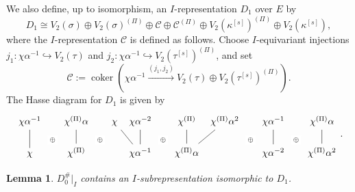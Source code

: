 \documentclass[a4paper,10pt,twoside]{amsart}
\newtheorem{lemma}[theorem]{Lemma}
\theoremstyle{definition}
\numberwithin{equation}{section}
\begin{document}
We also define, up to isomorphism, an \(I\)-representation
\(D_1\) over \(E\) by
\begin{equation*}
D_1\cong V_2(\sigma)\oplus V_2(\sigma)^{(\Pi)}
\oplus\mathcal C\oplus \mathcal C^{(\Pi)} \oplus V_2(\kappa^{[s]})^{(\Pi)}
\oplus V_2(\kappa^{[s]}),
\end{equation*}
where the \(I\)-representation \(\mathcal C\) is defined as follows.
Choose \(I\)-equivariant injections $j_1:\chi\alpha^{-1}\hookrightarrow V_2(\tau)$ and $j_2:\chi\alpha^{-1}\hookrightarrow V_2(\tau^{[s]})^{(\Pi)}$, and set
\[
\mathcal C:=
\operatorname{coker}\!\left(
\chi\alpha^{-1}
\xrightarrow{(j_1,j_2)}
V_2(\tau)\oplus V_2(\tau^{[s]})^{(\Pi)}
\right).
\]
The Hasse diagram for $D_1$ is given by \[
\begin{tikzcd}[column sep=0.35em, row sep=1.5em]
{\chi \alpha^{-1}} \arrow[d, no head] & \arrow[d, "\oplus" description, draw=none] & {\chi^{(\Pi)}\alpha} \arrow[d, no head] & \arrow[d, "\oplus" description, draw=none] & \chi \arrow[dr, no head] & {\chi\alpha^{-2}} \arrow[d, no head] & \arrow[d, "\oplus" description, draw=none] & {\chi^{(\Pi)}} \arrow[d, no head] & {\chi^{(\Pi)}\alpha^2} \arrow[dl, no head] & \arrow[d, "\oplus" description, draw=none] & {\chi\alpha^{-1}} \arrow[d, no head] & \arrow[d, "\oplus" description, draw=none] & {\chi^{(\Pi)}\alpha} \arrow[d, no head] \\
\chi & {} & {\chi^{(\Pi)}} & {} & {} & {\chi\alpha^{-1}} & {} & {\chi^{(\Pi)}\alpha} & {} & {} & {\chi\alpha^{-2}} & {} & {\chi^{(\Pi)}\alpha^2}
\end{tikzcd}.
\]

\begin{lemma}
$D_0^\#|_I$ contains an $I$-subrepresentation isomorphic to $D_1$.
\end{lemma}
\end{document}
